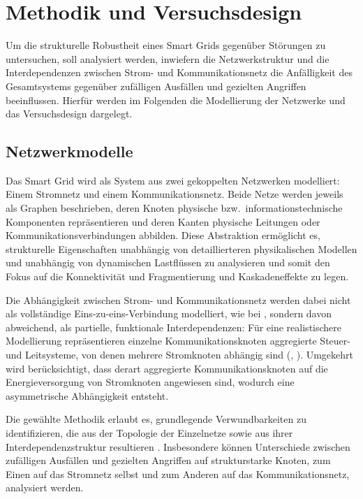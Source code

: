 
\section{Methodik und Versuchsdesign}

Um die strukturelle Robustheit eines Smart Grids gegenüber Störungen zu untersuchen, soll analysiert werden, inwiefern die Netzwerkstruktur und die Interdependenzen zwischen Strom- und Kommunikationsnetz die Anfälligkeit des Gesamtsystems gegenüber zufälligen Ausfällen und gezielten Angriffen beeinflussen. Hierfür werden im Folgenden die Modellierung der Netzwerke und das Versuchsdesign dargelegt. 

\subsection{Netzwerkmodelle}
Das Smart Grid wird als System aus zwei gekoppelten Netzwerken modelliert: Einem Stromnetz und einem Kommunikationsnetz. Beide Netze werden jeweils als Graphen beschrieben, deren Knoten physische bzw.\ informationstechnische Komponenten repräsentieren und deren Kanten physische Leitungen oder Kommunikationsverbindungen abbilden. Diese Abstraktion ermöglicht es, strukturelle Eigenschaften unabhängig von detaillierteren physikalischen Modellen und unabhängig von dynamischen Lastflüssen zu analysieren und somit den Fokus auf die Konnektivität und Fragmentierung und Kaskadeneffekte zu legen. 

Die Abhängigkeit zwischen Strom- und Kommunikationsnetz werden dabei nicht als vollständige Eins-zu-eins-Verbindung modelliert, wie bei \cite{Buldyrev2010Interdependent}, sondern davon abweichend, als partielle, funktionale Interdependenzen: Für eine realistischere Modellierung repräsentieren einzelne Kommunikationsknoten aggregierte Steuer- und Leitsysteme, von denen mehrere Stromknoten abhängig sind (\cite[vgl.][2]{Parshani2010}, \cite[vgl.][1709]{Yagan2012}). Umgekehrt wird berücksichtigt, dass derart aggregierte Kommunikationsknoten auf die Energieversorgung von Stromknoten angewiesen sind, wodurch eine asymmetrische Abhängigkeit entsteht.

Die gewählte Methodik erlaubt es, grundlegende Verwundbarkeiten zu identifizieren, die aus der Topologie der Einzelnetze sowie aus ihrer Interdependenzstruktur resultieren \cite[vgl.][1025]{Buldyrev2010Interdependent}. Insbesondere können Unterschiede zwischen zufälligen Ausfällen und gezielten Angriffen auf strukturstarke Knoten, zum Einen auf das Stromnetz selbst und zum Anderen auf das Kommunikationsnetz, analysiert werden.

